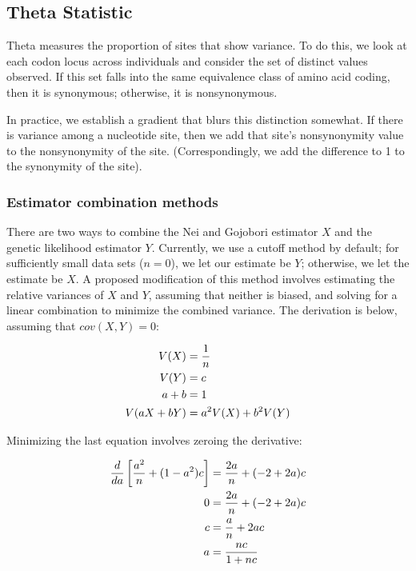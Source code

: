 \documentclass{article}
\begin{document}
    \subsection{Theta Statistic}
      \label{sec:theta-statistic}

      Theta measures the proportion of sites that show variance. To do this, we
      look at each codon locus across individuals and consider the set of
      distinct values observed. If this set falls into the same equivalence
      class of amino acid coding, then it is synonymous; otherwise, it is
      nonsynonymous.

      In practice, we establish a gradient that blurs this distinction somewhat.
      If there is variance among a nucleotide site, then we add that site's
      nonsynonymity value to the nonsynonymity of the site. (Correspondingly, we
	  add the difference to 1 to the synonymity of the site).

      \subsubsection{Estimator combination methods}
	\label{sec:variance-minimization}

	There are two ways to combine the Nei and Gojobori estimator $X$ and the
	genetic likelihood estimator $Y$. Currently, we use a cutoff method by
	default; for sufficiently small data sets ($n = 0$), we let our estimate
	be $Y$; otherwise, we let the estimate be $X$. A proposed modification
	of this method involves estimating the relative variances of $X$ and
	$Y$, assuming that neither is biased, and solving for a linear
	combination to minimize the combined variance. The derivation is below,
	assuming that $cov(X, Y) = 0$:

	\begin{align*}
	  V(X)		& = {1 \over n} \\ %
	  V(Y)		& = c \\ %
	  a + b 	& = 1 \\ %
	  V(aX + bY)	& = a^2 V(X) + b^2 V(Y)
	\end{align*}

	Minimizing the last equation involves zeroing the derivative:

	\begin{align*}
	  {d \over da} \left[{a^2 \over n} + (1 - a^2) c\right]
	    & = {2a \over n} + (-2 + 2a) c \\ %
	  0 & = {2a \over n} + (-2 + 2a) c \\ %
	  c & = {a \over n} + 2ac \\ %
	  a & = {nc \over 1 + nc}
	\end{align*}
\end{document}
